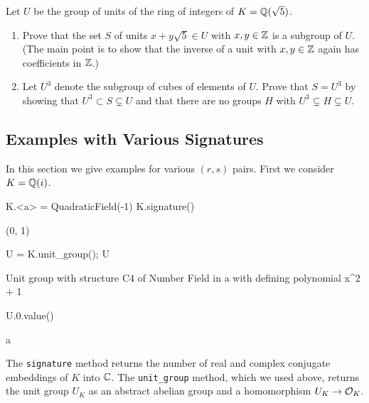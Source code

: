 \begin{exercise}
	Let $U$ be the group of units of the ring of integers
	of $K=\mathbb{Q}(\sqrt{5})$.
	\begin{enumerate}
		\item Prove that the set $S$ of units $x+y\sqrt{5} \in U$ with
		$x,y\in\mathbb{Z}$ is a subgroup of $U$.  (The main point is to show that
		the inverse of a unit with $x,y\in\mathbb{Z}$ again has coefficients in
		$\mathbb{Z}$.)
		\item Let $U^3$ denote the subgroup of cubes of elements of $U$.
		Prove that $S=U^3$ by showing that $U^3\subset S \subsetneq U$ and
		that there are no groups $H$ with $U^3\subsetneq H \subsetneq U$.
	\end{enumerate}
\end{exercise}

\subsection{Examples with Various Signatures}

In this section we give examples for various $(r,s)$ pairs.
First we consider $K=\mathbb{Q}(i)$.
\begin{sagecode}
\begin{sagecell}
K.<a> = QuadraticField(-1)
K.signature()
\end{sagecell}
\begin{sageout}
(0, 1)
\end{sageout}
\begin{sagecell}
U = K.unit_group(); U
\end{sagecell}
\begin{sageout}
Unit group with structure C4 of Number Field in a with
defining polynomial x^2 + 1
\end{sageout}
\begin{sagecell}
U.0.value()
\end{sagecell}
\begin{sageout}
a
\end{sageout}
\end{sagecode}

The {\tt signature} method returns the number of real and complex conjugate
embeddings of $K$ into $\mathbb{C}$. The {\tt unit\_group} method, which we used above,
returns the unit group $U_K$ as an abstract abelian group and a
homomorphism $U_K\to \mathcal{O}_K$.

